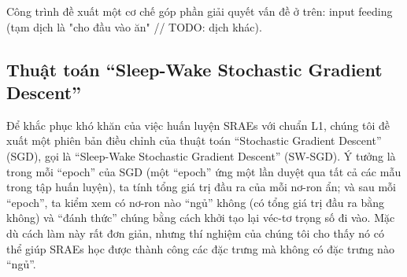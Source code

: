 Công trình \cite{attentionThangLuong2015} đề xuất một cơ chế góp phần giải quyết vấn đề ở trên: input feeding (tạm dịch là "cho đầu vào ăn" // TODO: dịch khác). 

\subsection{Thuật toán ``Sleep-Wake Stochastic Gradient Descent''}
Để khắc phục khó khăn của việc huấn luyện SRAEs với chuẩn L1, chúng tôi đề xuất một phiên bản điều chỉnh của thuật toán ``Stochastic Gradient Descent'' (SGD), gọi là ``Sleep-Wake Stochastic Gradient Descent'' (SW-SGD). Ý tưởng là trong mỗi ``epoch'' của SGD (một ``epoch'' ứng một lần duyệt qua tất cả các mẫu trong tập huấn luyện), ta tính tổng giá trị đầu ra của mỗi nơ-ron ẩn; và sau mỗi ``epoch'', ta kiểm xem có nơ-ron nào ``ngủ'' không (có tổng giá trị đầu ra bằng không) và ``đánh thức'' chúng bằng cách khởi tạo lại véc-tơ trọng số đi vào. Mặc dù cách làm này rất đơn giản, nhưng thí nghiệm của chúng tôi cho thấy nó có thể giúp SRAEs học được thành công các đặc trưng mà không có đặc trưng nào ``ngủ''.

